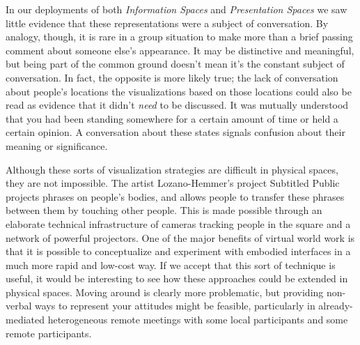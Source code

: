 In our deployments of both \emph{Information Spaces} and \emph{Presentation Spaces} we saw little evidence that these representations were a subject of conversation. By analogy, though, it is rare in a group situation to make more than a brief passing comment about someone else's appearance. It may be distinctive and meaningful, but being part of the common ground doesn't mean it's the constant subject of conversation. In fact, the opposite is more likely true; the lack of conversation about people's locations the visualizations based on those locations could also be read as evidence that it didn't \emph{need} to be discussed. It was mutually understood that you had been standing somewhere for a certain amount of time or held a certain opinion. A conversation about these states signals confusion about their meaning or significance.

Although these sorts of visualization strategies are difficult in physical spaces, they are not impossible. The artist Lozano-Hemmer's project Subtitled Public \citep{SubtitledPublic:2005wt} projects phrases on people's bodies, and allows people to transfer these phrases between them by touching other people. This is made possible through an elaborate technical infrastructure of cameras tracking people in the square and a network of powerful projectors. One of the major benefits of virtual world work is that it is possible to conceptualize and experiment with embodied interfaces in a much more rapid and low-cost way. If we accept that this sort of technique is useful, it would be interesting to see how these approaches could be extended in physical spaces. Moving around is clearly more problematic, but providing non-verbal ways to represent your attitudes might be feasible, particularly in already-mediated heterogeneous remote meetings with some local participants and some remote participants.

